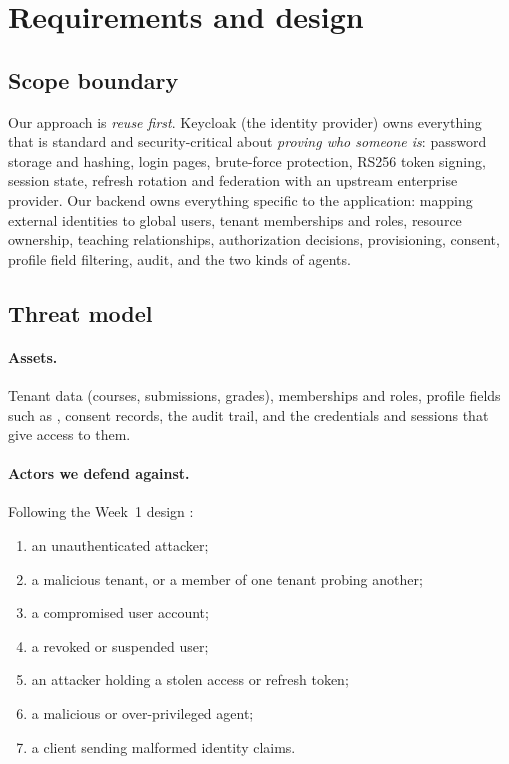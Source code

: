 \section{Requirements and design}
\label{sec:design}

\subsection{Scope boundary}
Our approach is \emph{reuse first}. Keycloak (the identity provider) owns everything that is standard and security-critical about \emph{proving who someone is}: password storage and hashing, login pages, brute-force protection, RS256 token signing, session state, refresh rotation and federation with an upstream enterprise provider. Our backend owns everything specific to the application: mapping external identities to global users, tenant memberships and roles, resource ownership, teaching relationships, authorization decisions, provisioning, consent, profile field filtering, audit, and the two kinds of agents.

\subsection{Threat model}
\paragraph{Assets.} Tenant data (courses, submissions, grades), memberships and roles, profile fields such as , consent records, the audit trail, and the credentials and sessions that give access to them.

\paragraph{Actors we defend against.} Following the Week~1 design \cite{week1}:
\begin{enumerate}
  \item an unauthenticated attacker;
  \item a malicious tenant, or a member of one tenant probing another;
  \item a compromised user account;
  \item a revoked or suspended user;
  \item an attacker holding a stolen access or refresh token;
  \item a malicious or over-privileged agent;
  \item a client sending malformed identity claims.
\end{enumerate}

